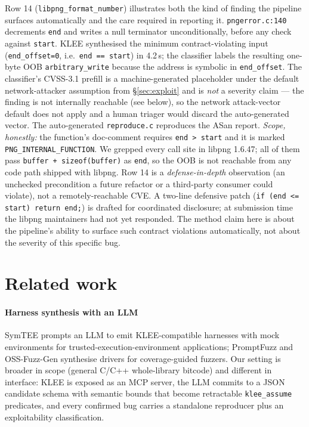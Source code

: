 \documentclass[3p,times,procedia]{elsarticle}
\begin{document}
Row 14 (\texttt{libpng\_format\_number}) illustrates both the kind of finding the pipeline surfaces automatically and the care required in reporting it. \texttt{pngerror.c:140} decrements \texttt{end} and writes a null terminator unconditionally, before any check against \texttt{start}. KLEE synthesised the minimum contract-violating input (\texttt{end\_offset=0}, i.e.\ \texttt{end == start}) in 4.2\,s; the classifier labels the resulting one-byte OOB \texttt{arbitrary\_write} because the address is symbolic in \texttt{end\_offset}. The classifier's CVSS-3.1 prefill is a machine-generated placeholder under the default network-attacker assumption from \S\ref{sec:exploit} and is \emph{not} a severity claim --- the finding is not internally reachable (see below), so the network attack-vector default does not apply and a human triager would discard the auto-generated vector. The auto-generated \texttt{reproduce.c} reproduces the ASan report. \emph{Scope, honestly:} the function's doc-comment requires \texttt{end > start} and it is marked \texttt{PNG\_INTERNAL\_FUNCTION}. We grepped every call site in libpng 1.6.47; all of them pass \texttt{buffer + sizeof(buffer)} as \texttt{end}, so the OOB is not reachable from any code path shipped with libpng. Row 14 is a \emph{defense-in-depth} observation (an unchecked precondition a future refactor or a third-party consumer could violate), not a remotely-reachable CVE. A two-line defensive patch (\texttt{if (end <= start) return end;}) is drafted for coordinated disclosure; at submission time the libpng maintainers had not yet responded. The method claim here is about the pipeline's ability to surface such contract violations automatically, not about the severity of this specific bug.

\section{Related work}
\label{sec:related}

\paragraph{Harness synthesis with an LLM} SymTEE \cite{symtee} prompts an LLM to emit KLEE-compatible harnesses with mock environments for trusted-execution-environment applications; PromptFuzz \cite{promptfuzz} and OSS-Fuzz-Gen \cite{ossfuzzgen} synthesise drivers for coverage-guided fuzzers. Our setting is broader in scope (general C/C++ whole-library bitcode) and different in interface: KLEE is exposed as an MCP server, the LLM commits to a JSON candidate schema with semantic bounds that become retractable \texttt{klee\_assume} predicates, and every confirmed bug carries a standalone reproducer plus an exploitability classification.
\end{document}
